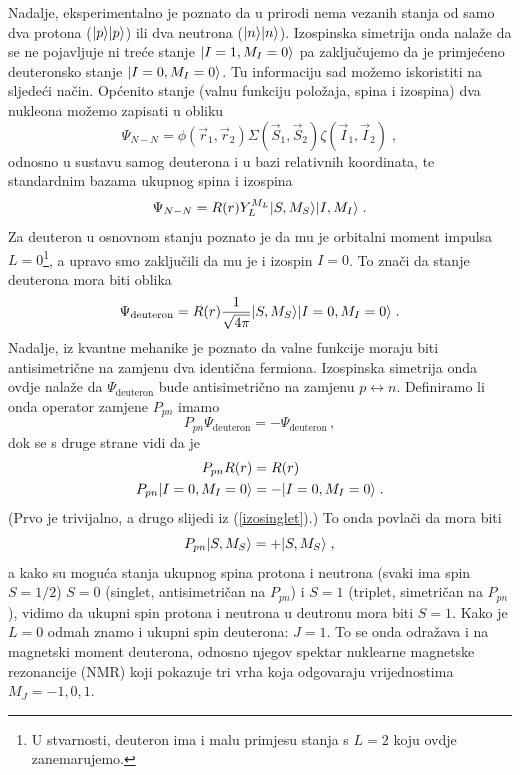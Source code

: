 \begin{primjer}[deuteron]
Nadalje, eksperimentalno je poznato da u prirodi nema vezanih stanja
od samo dva protona ($| p \rangle| p \rangle$)  ili dva neutrona
($| n \rangle| n \rangle$). Izospinska simetrija onda nalaže da se ne pojavljuje
ni treće stanje $| I=1, M_I=0 \rangle$ pa zaključujemo da je primjećeno deuteronsko
stanje $| I=0, M_I = 0 \rangle$.
Tu informaciju sad možemo iskoristiti na sljedeći način. Općenito
stanje (valnu funkciju položaja, spina i izospina) dva nukleona možemo zapisati u obliku
\begin{equation}
 \Psi_{N-N} = \phi(\vec{r}_1, \vec{r}_2) \Sigma(\vec{S}_1, \vec{S}_2)
\zeta(\vec{I}_1, \vec{I}_2) \;,
\end{equation}
odnosno u sustavu samog deuterona i u bazi relativnih koordinata, te
standardnim bazama ukupnog spina i izospina
\begin{equation}
 \Psi_{N-N} = R(r) Y^{M_L}_{L} | S, M_S \rangle | I, M_I \rangle \;.
\end{equation}
Za deuteron u osnovnom stanju poznato je da mu je orbitalni moment
impulsa $L=0$\footnote{U stvarnosti, deuteron ima i malu primjesu
stanja s $L=2$ koju ovdje zanemarujemo.}, a upravo smo zaključili 
da mu je i izospin $I=0$.
To znači da stanje deuterona mora biti oblika
\begin{equation}
\Psi_{\text{deuteron}} = R(r) \frac{1}{\sqrt{4\pi}} 
| S, M_S \rangle | I=0,M_I=0 \rangle\;.
\end{equation}
Nadalje, iz kvantne mehanike je poznato da valne funkcije moraju biti
antisimetrične na zamjenu dva identična fermiona. Izospinska
simetrija onda ovdje nalaže da $\Psi_{\text{deuteron}}$ bude
antisimetrično na zamjenu $p\leftrightarrow n$. Definiramo li onda
operator zamjene $P_{pn}$ imamo
\begin{equation}
   P_{pn} \Psi_{\text{deuteron}} = - \Psi_{\text{deuteron}} \,,
\end{equation}
dok se s druge strane vidi da je
\begin{align}
P_{pn} R(r) &= R(r) \\
P_{pn} | I=0,M_I=0 \rangle &= - | I=0,M_I=0 \rangle \;.
\end{align}
(Prvo je trivijalno, a drugo slijedi iz (\ref{izosinglet}).)
To onda povlači da mora biti
\begin{equation}
 P_{pn} | S, M_S \rangle = + | S, M_S \rangle \;,
\end{equation}
a kako su moguća stanja ukupnog spina protona i neutrona (svaki ima spin
$S=1/2$) $S=0$ (singlet, antisimetričan
na $P_{pn}$) i $S=1$ (triplet, simetričan na $P_{pn}$), vidimo da
ukupni spin protona i neutrona u deutronu mora biti $S=1$. Kako
je $L=0$ odmah znamo i ukupni spin deuterona: $J=1$.
To se onda odražava i na magnetski moment deuterona, odnosno
njegov spektar nuklearne magnetske rezonancije (NMR) koji pokazuje
tri vrha koja odgovaraju vrijednostima $M_J = -1, 0, 1$.
\end{primjer}

